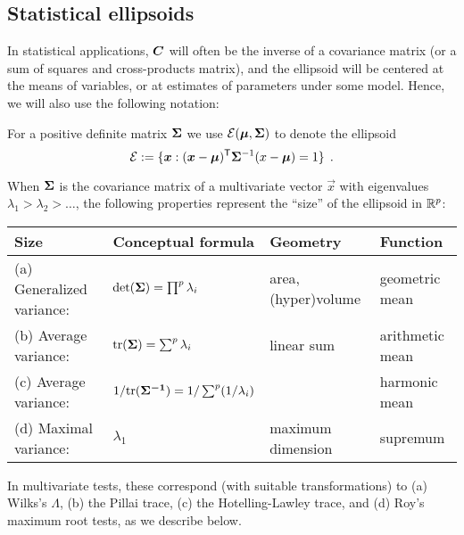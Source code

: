 \subsection{Statistical ellipsoids}

In statistical applications, $\bm{C}$ will often be the inverse of a covariance
matrix (or a sum of squares and cross-products matrix), and the ellipsoid will
be centered at the means of variables, or at estimates of parameters under some model.
Hence, we will also use the following notation:

For a positive definite matrix
$\bm{\Sigma}$ we use $\mathcal{E}(\bm{\mu},\bm{\Sigma})$ to denote the ellipsoid
\begin{equation}\label{eq:ellipsoid3}
\mathcal{E} := \{ \bm{x} : (\bm{x}-\bm{\mu})^\mathsf{T} \bm{\Sigma}^{-1} (x-\bm{\mu}) = 1 \} \:\: .
 \end{equation}

When $\bm{\Sigma}$ is the covariance matrix of a multivariate vector $\vec{x}$ with eigenvalues
$\lambda_1 > \lambda_2 > \dots$,
the following
properties represent the ``size'' of the ellipsoid in $\mathbb{R}^{p}$:

\begin{tabular}{llll}
    Size                   &  Conceptual formula                    & Geometry       & Function \\
\hline
(a) Generalized variance:  & $\mathrm{det} (\bm{\Sigma}) = \prod^p \lambda_i$ & area, (hyper)volume & geometric mean\\
(b) Average variance:        & $\mathrm{tr} (\bm{\bm{\Sigma}}) = \sum^p \lambda_i $ & linear sum & arithmetic mean\\
(c) Average variance:        & $1/ \mathrm{tr} (\bm{\bm{\Sigma}^{-1}}) = 1/\sum^p (1/\lambda_i) $ &  & harmonic mean\\
(d) Maximal variance:      & $\lambda_1$ & maximum dimension & supremum
 \end{tabular}
\medskip

\noindent In multivariate tests, these correspond (with suitable transformations) to (a) Wilks's $\Lambda$,
(b) the Pillai trace, (c) the Hotelling-Lawley  trace,  and (d) Roy's maximum root tests, as we describe
below.

